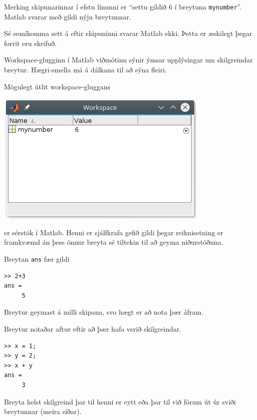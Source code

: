 \documentclass[justified,nobib]{tufte-handout}
\begin{document}
Merking skipunarinnar í efstu línunni er ``settu gildið $6$ í breytuna \texttt{mynumber}''. Matlab svarar með gildi nýju breytunnar.

Sé semíkomma sett á eftir skipuninni svarar Matlab ekki. Þetta er æskilegt þegar forrit eru skrifuð.

Workspace-glugginn í Matlab viðmótinu sýnir ýmsar upplýsingar um skilgreindar breytur. Hægri-smella má á dálkana til að sýna fleiri.
\begin{marginfigure}
\caption{Mögulegt útlit workspace-gluggans}    
\includegraphics[width=\linewidth]{Pics/workspace-window}
\end{marginfigure}

 er sérstök í Matlab. Henni er sjálfkrafa gefið gildi þegar reiknisetning er framkvæmd án þess önnur breyta sé tiltekin til að geyma niðurstöðuna.
\begin{example}
\caption{Breytan \texttt{ans} fær gildi}
\begin{verbatim}
>> 2+3
ans = 
     5
\end{verbatim}
\end{example}

Breytur geymast á milli skipana, svo hægt er að nota þær áfram.

\begin{example}
\caption{Breytur notaðar aftur eftir að þær hafa verið skilgreindar.}
\begin{verbatim}
>> x = 1;
>> y = 2;
>> x + y
ans =
     3
\end{verbatim}
\end{example}

Breyta helst skilgreind þar til henni er eytt eða þar til við förum út úr sviði  breytunnar (meira síðar).
\end{document}
